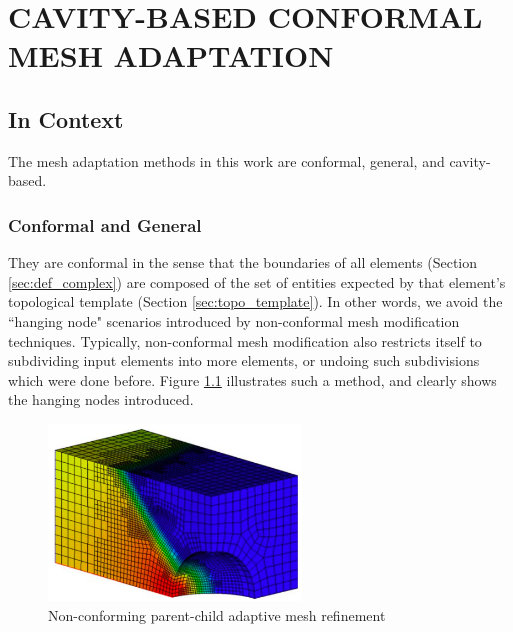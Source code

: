 
\chapter{CAVITY-BASED CONFORMAL MESH ADAPTATION}
\label{chap:adapt}

\section{In Context}

The mesh adaptation methods in this work are
conformal, general, and cavity-based.

\subsection {Conformal and General}

They are conformal in the sense that the boundaries of all
elements (Section \ref{sec:def_complex}) are composed
of the set of entities expected by that element's
topological template (Section \ref{sec:topo_template}).
In other words, we avoid the ``hanging node" scenarios
introduced by non-conformal mesh modification techniques.
Typically, non-conformal mesh modification also restricts
itself to subdividing input elements into more elements,
or undoing such subdivisions which were done before.
Figure \ref{fig:hex_amr} illustrates such a method,
and clearly shows the hanging nodes introduced.

\begin{figure}
\begin{center}
\includegraphics[width=0.6\textwidth]{hex_amr.png}
\caption{Non-conforming parent-child adaptive mesh refinement
\cite{kirk2006libmesh}}
\label{fig:hex_amr}
\end{center}
\end{figure}

